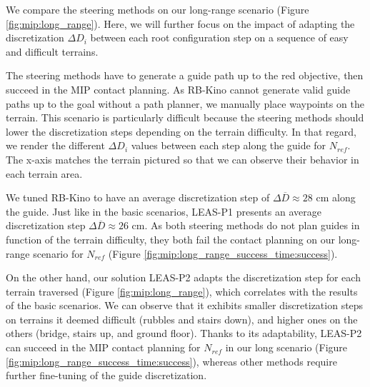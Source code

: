 We compare the steering methods on our long-range scenario (Figure \ref{fig:mip:long_range}).
Here, we will further focus on the impact of adapting the discretization $\Delta D_i$ between each root configuration step on a sequence of easy and difficult terrains.

The steering methods have to generate a guide path up to the red objective, then succeed in the MIP contact planning.
As RB-Kino cannot generate valid guide paths up to the goal without a path planner, we manually place waypoints on the terrain.
This scenario is particularly difficult because the steering methods should lower the discretization steps depending on the terrain difficulty.
In that regard, we render the different $\Delta D_i$ values between each step along the guide for $N_{ref}$.
The x-axis matches the terrain pictured so that we can observe their behavior in each terrain area.

We tuned RB-Kino to have an average discretization step of $\Delta \overline{D} \approx 28$ cm along the guide.
Just like in the basic scenarios, LEAS-P1 presents an average discretization step $\Delta \overline{D} \approx 26$ cm.
As both steering methods do not plan guides in function of the terrain difficulty, they both fail the contact planning on our long-range scenario for $N_{ref}$ (Figure \ref{fig:mip:long_range_success_time:success}).

On the other hand, our solution LEAS-P2 adapts the discretization step for each terrain traversed (Figure \ref{fig:mip:long_range}), which correlates with the results of the basic scenarios. 
We can observe that it exhibits smaller discretization steps on terrains it deemed difficult (rubbles and stairs down), and higher ones on the others (bridge, stairs up, and ground floor).
Thanks to its adaptability, LEAS-P2 can succeed in the MIP contact planning for $N_{ref}$ in our long scenario (Figure \ref{fig:mip:long_range_success_time:success}), whereas other methods require further fine-tuning of the guide discretization.

